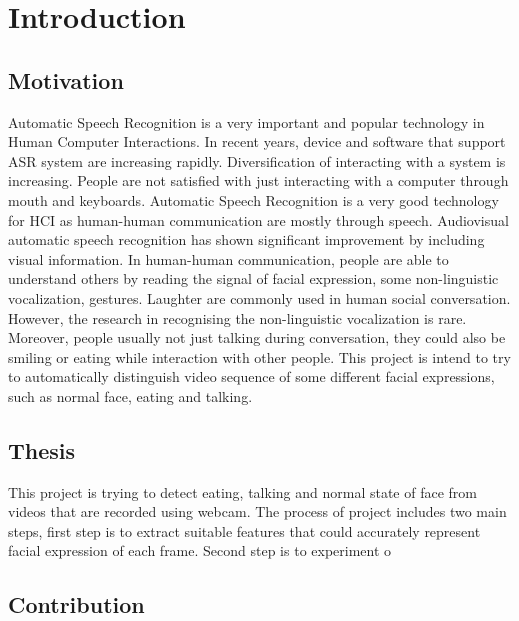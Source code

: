 \chapter{Introduction}
\section{Motivation}
Automatic Speech Recognition is a very important and popular technology in Human Computer Interactions. In recent years, device and software that support ASR system are increasing rapidly. Diversification of interacting with a system is increasing. People are not satisfied with just interacting with a computer through mouth and keyboards. Automatic Speech Recognition is a very good technology for HCI as human-human communication are mostly through speech. Audiovisual automatic speech recognition has shown significant improvement by including visual information. In human-human communication, people are able to understand others by reading the signal of facial expression, some non-linguistic vocalization, gestures. \cite{petridis2011prediction} Laughter are commonly used in human social conversation. However, the research in recognising the non-linguistic vocalization is rare. Moreover, people usually not just talking during conversation, they could also be smiling or eating while interaction with other people. This project is intend to try to automatically distinguish video sequence of some different facial expressions, such as normal face, eating and talking.
\section{Thesis}
This project is trying to detect eating, talking and normal state of face from videos that are recorded using webcam. The process of project includes two main steps, first step is to extract suitable features that could accurately represent facial expression of each frame. Second step is to experiment o
\section{Contribution}